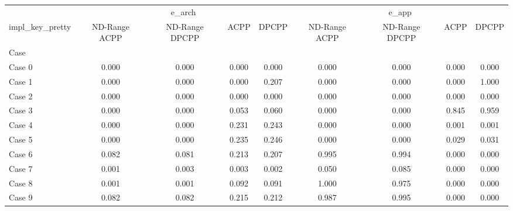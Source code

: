 \begin{tabular}{lcccccccc}
\toprule
 & \multicolumn{4}{c}{e_arch} & \multicolumn{4}{c}{e_app} \\
impl_key_pretty & ND-Range ACPP & ND-Range DPCPP & ACPP & DPCPP & ND-Range ACPP & ND-Range DPCPP & ACPP & DPCPP \\
Case &  &  &  &  &  &  &  &  \\
\midrule
Case 0 & 0.000 & 0.000 & 0.000 & 0.000 & 0.000 & 0.000 & 0.000 & 0.000 \\
Case 1 & 0.000 & 0.000 & 0.000 & 0.207 & 0.000 & 0.000 & 0.000 & 1.000 \\
Case 2 & 0.000 & 0.000 & 0.000 & 0.000 & 0.000 & 0.000 & 0.000 & 0.000 \\
Case 3 & 0.000 & 0.000 & 0.053 & 0.060 & 0.000 & 0.000 & 0.845 & 0.959 \\
Case 4 & 0.000 & 0.000 & 0.231 & 0.243 & 0.000 & 0.000 & 0.001 & 0.001 \\
Case 5 & 0.000 & 0.000 & 0.235 & 0.246 & 0.000 & 0.000 & 0.029 & 0.031 \\
Case 6 & 0.082 & 0.081 & 0.213 & 0.207 & 0.995 & 0.994 & 0.000 & 0.000 \\
Case 7 & 0.001 & 0.003 & 0.003 & 0.002 & 0.050 & 0.085 & 0.000 & 0.000 \\
Case 8 & 0.001 & 0.001 & 0.092 & 0.091 & 1.000 & 0.975 & 0.000 & 0.000 \\
Case 9 & 0.082 & 0.082 & 0.215 & 0.212 & 0.987 & 0.995 & 0.000 & 0.000 \\
\bottomrule
\end{tabular}
